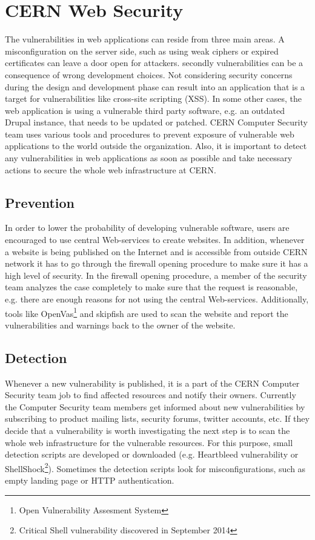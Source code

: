 \section{CERN Web Security}
The vulnerabilities in web applications can reside from three main areas. A misconfiguration on the server side, such as using weak ciphers or expired certificates can leave a door open for attackers. secondly vulnerabilities can be a consequence of wrong development choices. Not considering security concerns during the design and development phase can result into an application that is a target for vulnerabilities like cross-site scripting (XSS). In some other cases, the web application is using a vulnerable third party software, e.g. an outdated Drupal instance, that needs to be updated or patched. CERN Computer Security team uses various tools and procedures to prevent exposure of vulnerable web applications to the world outside the organization. Also, it is important to detect any vulnerabilities in web applications as soon as possible and take necessary actions to secure the whole web infrastructure at CERN.

\subsection{Prevention}
In order to lower the probability of developing vulnerable software, users are encouraged to use central Web-services to create websites. In addition, whenever a website is being published on the Internet and is accessible from outside CERN network it has to go through the firewall opening procedure to make sure it has a high level of security. In the firewall opening procedure, a member of the security team analyzes the case completely to make sure that the request is reasonable, e.g. there are enough reasons for not using the central Web-services. Additionally, tools like OpenVas\footnote{Open Vulnerability Assesment System} and skipfish are used to scan the website and report the vulnerabilities and warnings back to the owner of the website. 

\subsection{Detection}
Whenever a new vulnerability is published, it is a part of the CERN Computer Security team job to find affected resources and notify their owners. Currently the Computer Security team members get informed about new vulnerabilities by subscribing to product mailing lists, security forums, twitter accounts, etc. If they decide that a vulnerability is worth investigating the next step is to scan the whole web infrastructure for the vulnerable resources. For this purpose, small detection scripts are developed or downloaded (e.g. Heartbleed vulnerability or ShellShock\footnote{Critical Shell vulnerability discovered in September 2014}). Sometimes the detection scripts look for misconfigurations, such as empty landing page or HTTP authentication. 


